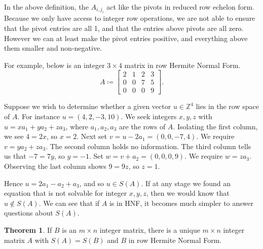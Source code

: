 \documentclass[12pt,a4paper]{article}
\newcommand{\Z}{\mathbb{Z}}
\theoremstyle{definition}
\newtheorem{theorem}{Theorem}[section]
\begin{document}
In the above definition, the $A_{i,j_i}$ act like the pivots in reduced row echelon form. Because we only have access to integer row operations, we are not able to ensure that the pivot entries are all 1, and that the entries above pivots are all zero. However we can at least make the pivot entries positive, and everything above them smaller and non-negative.

For example, below is an integer $3\times4$ matrix in row Hermite Normal Form.
\[ A \coloneqq
  \begin{bmatrix}
    2 & 1 & 2 & 3 \\
    0 & 0 & 7 & 5 \\
    0 & 0 & 0 & 9
  \end{bmatrix}.
\]

Suppose we wish to determine whether a given vector $u\in\Z^4$ lies in the row space of $A$. For instance $u=(4,2,-3,10)$. We seek integers $x,y,z$ with $u=xa_1+ya_2+za_3$, where $a_1,a_2,a_3$ are the rows of $A$. Isolating the first column, we see $4=2x$, so $x=2$. Next set $v=u-2a_1=(0,0,-7,4)$. We require $v=ya_2+za_3$. The second column holds no information. The third column tells us that $-7=7y$, so $y=-1$. Set $w=v+a_2=(0,0,0,9)$. We require $w=za_3$. Observing the last column shows $9=9z$, so $z=1$.

Hence $u=2a_1-a_2+a_3$, and so $u\in S(A)$. If at any stage we found an equation that is not solvable for integer $x,y,z$, then we would know that $u\notin S(A)$. We can see that if $A$ is in HNF, it becomes much simpler to answer questions about $S(A)$.

\begin{theorem}
  If $B$ is an $m\times n$ integer matrix, there is a unique $m\times n$ integer matrix $A$ with $S(A)=S(B)$ and $B$ in row Hermite Normal Form.
\end{theorem}
\end{document}
